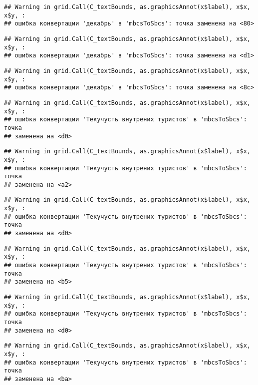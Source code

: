 \documentclass[
]{article}
\begin{document}
\begin{verbatim}
## Warning in grid.Call(C_textBounds, as.graphicsAnnot(x$label), x$x, x$y, :
## ошибка конвертации 'декабрь' в 'mbcsToSbcs': точка заменена на <80>
\end{verbatim}

\begin{verbatim}
## Warning in grid.Call(C_textBounds, as.graphicsAnnot(x$label), x$x, x$y, :
## ошибка конвертации 'декабрь' в 'mbcsToSbcs': точка заменена на <d1>
\end{verbatim}

\begin{verbatim}
## Warning in grid.Call(C_textBounds, as.graphicsAnnot(x$label), x$x, x$y, :
## ошибка конвертации 'декабрь' в 'mbcsToSbcs': точка заменена на <8c>
\end{verbatim}

\begin{verbatim}
## Warning in grid.Call(C_textBounds, as.graphicsAnnot(x$label), x$x, x$y, :
## ошибка конвертации 'Текучусть внутрених туристов' в 'mbcsToSbcs': точка
## заменена на <d0>
\end{verbatim}

\begin{verbatim}
## Warning in grid.Call(C_textBounds, as.graphicsAnnot(x$label), x$x, x$y, :
## ошибка конвертации 'Текучусть внутрених туристов' в 'mbcsToSbcs': точка
## заменена на <a2>
\end{verbatim}

\begin{verbatim}
## Warning in grid.Call(C_textBounds, as.graphicsAnnot(x$label), x$x, x$y, :
## ошибка конвертации 'Текучусть внутрених туристов' в 'mbcsToSbcs': точка
## заменена на <d0>
\end{verbatim}

\begin{verbatim}
## Warning in grid.Call(C_textBounds, as.graphicsAnnot(x$label), x$x, x$y, :
## ошибка конвертации 'Текучусть внутрених туристов' в 'mbcsToSbcs': точка
## заменена на <b5>
\end{verbatim}

\begin{verbatim}
## Warning in grid.Call(C_textBounds, as.graphicsAnnot(x$label), x$x, x$y, :
## ошибка конвертации 'Текучусть внутрених туристов' в 'mbcsToSbcs': точка
## заменена на <d0>
\end{verbatim}

\begin{verbatim}
## Warning in grid.Call(C_textBounds, as.graphicsAnnot(x$label), x$x, x$y, :
## ошибка конвертации 'Текучусть внутрених туристов' в 'mbcsToSbcs': точка
## заменена на <ba>
\end{verbatim}
\end{document}
